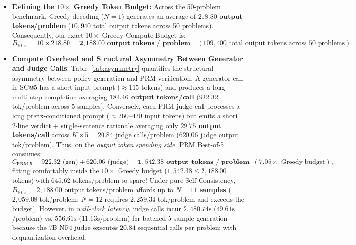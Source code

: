 \documentclass[10pt,a4paper]{article}
\begin{document}
\begin{itemize}
    \item \textbf{Defining the $10\times$ Greedy Token Budget:}
    Across the 50-problem benchmark, Greedy decoding ($N=1$) generates an average of \textbf{$218.80$ output tokens/problem} ($10{,}940$ total output tokens across 50 problems). Consequently, our exact $10\times$ Greedy Compute Budget is:
    \[
        B_{10\times} = 10 \times 218.80 = \mathbf{2{,}188.00\text{ output tokens / problem}} \quad (109{,}400\text{ total output tokens across 50 problems}).
    \]
    \item \textbf{Compute Overhead and Structural Asymmetry Between Generator and Judge Calls:}
    Table~\ref{tab:asymmetry} quantifies the structural asymmetry between policy generation and PRM verification. A generator call in SC@5 has a short input prompt ($\approx 115$ tokens) and produces a long multi-step completion averaging \textbf{$184.46$ output tokens/call} ($922.32$ tok/problem across 5 samples). Conversely, each PRM judge call processes a long prefix-conditioned prompt ($\approx 260$--$420$ input tokens) but emits a short 2-line verdict + single-sentence rationale averaging only \textbf{$29.75$ output tokens/call} across $\bar{K} \times 5 = 20.84$ judge calls/problem ($620.06$ judge output tok/problem). Thus, on the \textit{output token spending side}, PRM Best-of-5 consumes:
    \[
        C_{\text{PRM-5}} = 922.32\text{ (gen)} + 620.06\text{ (judge)} = \mathbf{1{,}542.38\text{ output tokens / problem}} \;\; (\mathbf{7.05\times}\text{ Greedy budget}),
    \]
    fitting comfortably inside the $10\times$ Greedy budget ($1{,}542.38 \le 2{,}188.00$ tokens) with $645.62$ tokens/problem to spare! Under pure Self-Consistency, $B_{10\times} = 2{,}188.00$ output tokens/problem affords up to \textbf{$N=11$ samples} ($2{,}059.08$ tok/problem; $N=12$ requires $2{,}259.34$ tok/problem and exceeds the budget). However, in \textit{wall-clock latency}, judge calls incur $2{,}480.74\text{s}$ ($49.61\text{s}$/problem) vs. $556.61\text{s}$ ($11.13\text{s}$/problem) for batched 5-sample generation because the 7B NF4 judge executes $20.84$ sequential calls per problem with dequantization overhead.
\end{itemize}
\end{document}

